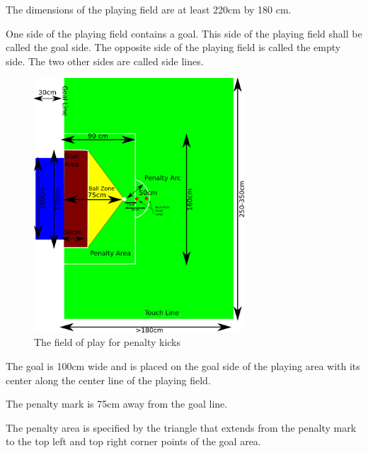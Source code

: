 \documentclass[12pt]{hurocup}
\begin{document}
\begin{lawlist}[PK]

\item The dimensions of the playing field are at least 220cm by
  180 cm. 

\item One side of the playing field contains a goal. This side of the
  playing field shall be called the goal side. The opposite side of
  the playing field is called the empty side. The two other sides are
  called side lines.

  \begin{figure}
    \begin{center}
      \includegraphics[width=0.7\textwidth]{Figures/penalty-kick}
    \end{center}
    \caption{The field of play for penalty kicks}
    \label{fig:field-penalty}
  \end{figure}

\item The goal is 100cm wide and is placed on the goal side of the
  playing area with its center along the center line of the playing
  field.

\item The penalty mark is 75cm away from the goal line.

\item The penalty area is specified by the triangle that extends from
the penalty mark to the top left and top right corner points of the
goal area.

\end{lawlist}
\end{document}
